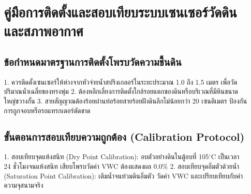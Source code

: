 \chapter{คู่มือการติดตั้งและสอบเทียบระบบเซนเซอร์วัดดินและสภาพอากาศ}
\label{app:appendixA}

\section{ข้อกำหนดมาตรฐานการติดตั้งโพรบวัดความชื้นดิน}
1. ควรติดตั้งเซนเซอร์ให้ห่างจากหัวจ่ายน้ำสปริงเกลอร์ในระยะประมาณ 1.0 ถึง 1.5 เมตร เพื่อวัดปริมาณน้ำเฉลี่ยของทรงพุ่ม
2. ต้องหลีกเลี่ยงการติดตั้งใกล้รอยแตกของดินหรือบริเวณที่มีหินขนาดใหญ่ขวางกั้น
3. สายสัญญาณต้องร้อยผ่านท่อร้อยสายร้อยฝังดินลึกไม่น้อยกว่า 20 เซนติเมตร ป้องกันการถูกจอบหรือรถแทรกเตอร์ตัดขาด

\section{ขั้นตอนการสอบเทียบความถูกต้อง (Calibration Protocol)}
1. สอบเทียบจุดแห้งสนิท (Dry Point Calibration): อบตัวอย่างดินในตู้อบที่ 105$^{\circ}$C เป็นเวลา 24 ชั่วโมงจนแห้งสนิท เสียบโพรบวัดค่า VWC ต้องแสดงผล 0.0\%
2. สอบเทียบจุดอิ่มตัวด้วยน้ำ (Saturation Point Calibration): เติมน้ำจนท่วมดินอิ่มตัว วัดค่า VWC และเปรียบเทียบกับค่าความจุสนามจริง
